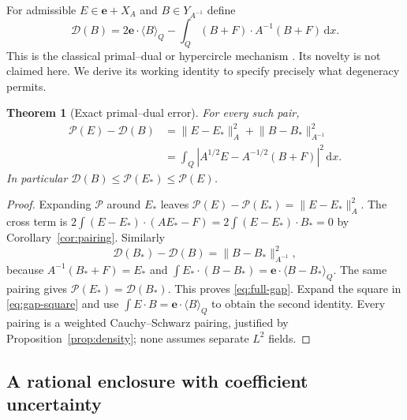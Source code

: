 \documentclass[11pt,a4paper]{article}
\numberwithin{equation}{section}
\newtheorem{theorem}{Theorem}[section]
\theoremstyle{definition}
\theoremstyle{remark}\newtheorem{remark}[theorem]{Remark}
\newcommand{\dd}{\,\mathrm dx}
\newcommand{\mean}[2]{\langle #1\rangle_{#2}}
\newcommand{\norm}[1]{\lVert #1\rVert}
\newcommand{\cP}{\mathcal P}
\newcommand{\cD}{\mathcal D}
\newcommand{\evec}{\boldsymbol e}
\begin{document}
For admissible \(E\in\evec+X_A\) and \(B\in Y_{A^{-1}}\) define
\[
 \cD(B)=2\evec\cdot\mean BQ
           -\int_Q(B+F)\cdot A^{-1}(B+F)\dd.
\]
This is the classical primal--dual or hypercircle mechanism
\cite{PragerSynge1947,Vondrejc2015}. Its novelty is not claimed here.
We derive its working identity to specify precisely what degeneracy
permits.

\begin{theorem}[Exact primal--dual error]\label{thm:hypercircle}
For every such pair,
\begin{align}
 \cP(E)-\cD(B)
 &=\norm{E-E_*}_A^2+\norm{B-B_*}_{A^{-1}}^2
       \label{eq:full-gap}\\
 &=\int_Q|A^{1/2}E-A^{-1/2}(B+F)|^2\dd.\label{eq:gap-square}
\end{align}
In particular \(\cD(B)\leq\cP(E_*)\leq\cP(E)\).
\end{theorem}

\begin{proof}
Expanding \(\cP\) around \(E_*\) leaves
\(\cP(E)-\cP(E_*)=\norm{E-E_*}_A^2\).
The cross term is
\(2\int (E-E_*)\cdot(AE_*-F)=2\int(E-E_*)\cdot B_*=0\)
by Corollary~\ref{cor:pairing}.
Similarly
\[
 \cD(B_*)-\cD(B)=\norm{B-B_*}_{A^{-1}}^2,
\]
because \(A^{-1}(B_*+F)=E_*\) and
\(\int E_*\cdot(B-B_*)=\evec\cdot\mean{B-B_*}Q\).
The same pairing gives \(\cP(E_*)=\cD(B_*)\).
This proves \eqref{eq:full-gap}.
Expand the square in \eqref{eq:gap-square} and use
\(\int E\cdot B=\evec\cdot\mean BQ\) to obtain the second identity.
Every pairing is a weighted Cauchy--Schwarz pairing, justified by
Proposition~\ref{prop:density}; none assumes separate \(L^2\) fields.
\end{proof}

\subsection{A rational enclosure with coefficient uncertainty}
\end{document}
